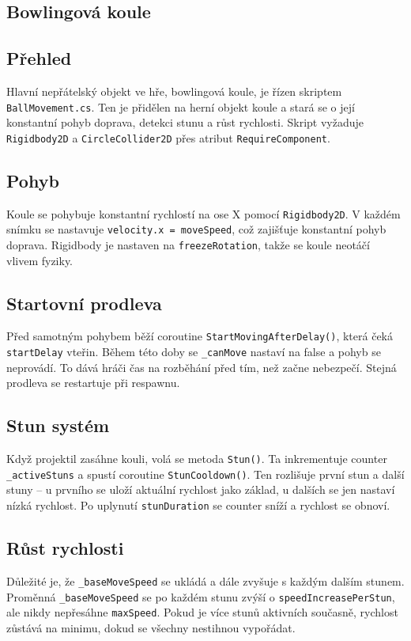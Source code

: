 \subsection{Bowlingová koule}

\subsection{Přehled}
Hlavní nepřátelský objekt ve hře, bowlingová koule, je řízen skriptem \texttt{BallMovement.cs}. Ten je přidělen na herní objekt koule a stará se o její konstantní pohyb doprava, detekci stunu a růst rychlosti. Skript vyžaduje \texttt{Rigidbody2D} a \texttt{CircleCollider2D} přes atribut \texttt{RequireComponent}.

\subsection{Pohyb}
Koule se pohybuje konstantní rychlostí na ose X pomocí \texttt{Rigidbody2D}. V každém snímku se nastavuje \texttt{velocity.x = moveSpeed}, což zajišťuje konstantní pohyb doprava. Rigidbody je nastaven na \texttt{freezeRotation}, takže se koule neotáčí vlivem fyziky.

\subsection{Startovní prodleva}
Před samotným pohybem běží coroutine \texttt{StartMovingAfterDelay()}, která čeká \texttt{startDelay} vteřin. Během této doby se \texttt{\_canMove} nastaví na false a pohyb se neprovádí. To dává hráči čas na rozběhání před tím, než začne nebezpečí. Stejná prodleva se restartuje při respawnu.

\subsection{Stun systém}
Když projektil zasáhne kouli, volá se metoda \texttt{Stun()}. Ta inkrementuje counter \texttt{\_activeStuns} a spustí coroutine \texttt{StunCooldown()}. Ten rozlišuje první stun a další stuny -- u prvního se uloží aktuální rychlost jako základ, u dalších se jen nastaví nízká rychlost. Po uplynutí \texttt{stunDuration} se counter sníží a rychlost se obnoví.

\subsection{Růst rychlosti}
Důležité je, že \texttt{\_baseMoveSpeed} se ukládá a dále zvyšuje s každým dalším stunem. Proměnná \texttt{\_baseMoveSpeed} se po každém stunu zvýší o \texttt{speedIncreasePerStun}, ale nikdy nepřesáhne \texttt{maxSpeed}. Pokud je více stunů aktivních současně, rychlost zůstává na minimu, dokud se všechny nestihnou vypořádat.

